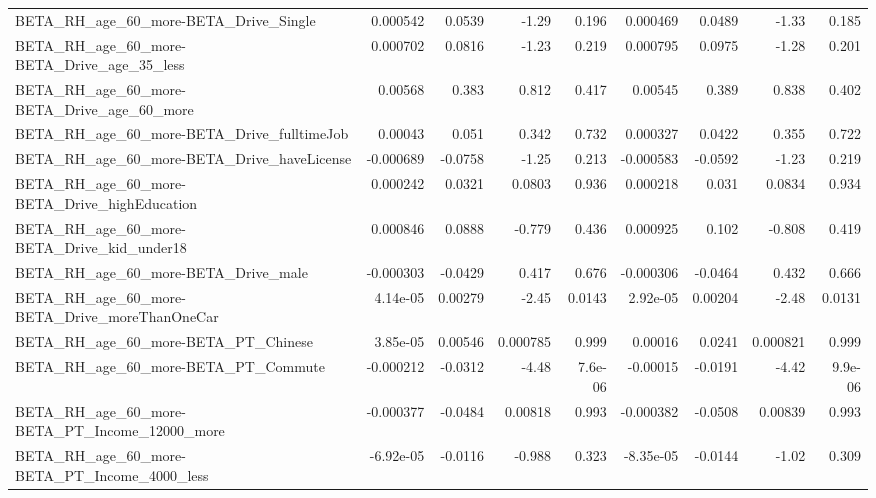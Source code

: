 \begin{tabular}{lrrrrrrrr}
BETA\_RH\_age\_60\_more-BETA\_Drive\_Single              &    0.000542 &       0.0539 &    -1.29 &    0.196 &   0.000469 &      0.0489 &        -1.33 &         0.185 \\
BETA\_RH\_age\_60\_more-BETA\_Drive\_age\_35\_less         &    0.000702 &       0.0816 &    -1.23 &    0.219 &   0.000795 &      0.0975 &        -1.28 &         0.201 \\
BETA\_RH\_age\_60\_more-BETA\_Drive\_age\_60\_more         &     0.00568 &        0.383 &    0.812 &    0.417 &    0.00545 &       0.389 &        0.838 &         0.402 \\
BETA\_RH\_age\_60\_more-BETA\_Drive\_fulltimeJob         &     0.00043 &        0.051 &    0.342 &    0.732 &   0.000327 &      0.0422 &        0.355 &         0.722 \\
BETA\_RH\_age\_60\_more-BETA\_Drive\_haveLicense         &   -0.000689 &      -0.0758 &    -1.25 &    0.213 &  -0.000583 &     -0.0592 &        -1.23 &         0.219 \\
BETA\_RH\_age\_60\_more-BETA\_Drive\_highEducation       &    0.000242 &       0.0321 &   0.0803 &    0.936 &   0.000218 &       0.031 &       0.0834 &         0.934 \\
BETA\_RH\_age\_60\_more-BETA\_Drive\_kid\_under18         &    0.000846 &       0.0888 &   -0.779 &    0.436 &   0.000925 &       0.102 &       -0.808 &         0.419 \\
BETA\_RH\_age\_60\_more-BETA\_Drive\_male                &   -0.000303 &      -0.0429 &    0.417 &    0.676 &  -0.000306 &     -0.0464 &        0.432 &         0.666 \\
BETA\_RH\_age\_60\_more-BETA\_Drive\_moreThanOneCar      &    4.14e-05 &      0.00279 &    -2.45 &   0.0143 &   2.92e-05 &     0.00204 &        -2.48 &        0.0131 \\
BETA\_RH\_age\_60\_more-BETA\_PT\_Chinese                &    3.85e-05 &      0.00546 & 0.000785 &    0.999 &    0.00016 &      0.0241 &     0.000821 &         0.999 \\
BETA\_RH\_age\_60\_more-BETA\_PT\_Commute                &   -0.000212 &      -0.0312 &    -4.48 &  7.6e-06 &   -0.00015 &     -0.0191 &        -4.42 &       9.9e-06 \\
BETA\_RH\_age\_60\_more-BETA\_PT\_Income\_12000\_more      &   -0.000377 &      -0.0484 &  0.00818 &    0.993 &  -0.000382 &     -0.0508 &      0.00839 &         0.993 \\
BETA\_RH\_age\_60\_more-BETA\_PT\_Income\_4000\_less       &   -6.92e-05 &      -0.0116 &   -0.988 &    0.323 &  -8.35e-05 &     -0.0144 &        -1.02 &         0.309 \\

\end{tabular}
